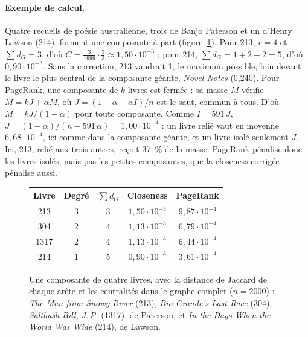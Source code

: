 \paragraph{Exemple de calcul.} Quatre recueils de poésie australienne, trois de
Banjo Paterson et un d'Henry Lawson (214), forment une composante à part
(figure~\ref{fig:exemple}). Pour 213, $r = 4$ et $\sum d_G = 3$, d'où
$C = \frac{3}{1999} \cdot \frac{3}{3} \approx 1{,}50 \cdot 10^{-3}$ ; pour 214,
$\sum d_G = 1 + 2 + 2 = 5$, d'où $0{,}90 \cdot 10^{-3}$. Sans la correction, 213
vaudrait 1, le maximum possible, loin devant le livre le plus central de la
composante géante, \emph{Novel Notes} (0,240). Pour PageRank, une composante de
$k$ livres est fermée : sa masse $M$ vérifie $M = kJ + \alpha M$, où
$J = (1 - \alpha + \alpha I)/n$ est le saut, commun à tous. D'où
$M = kJ/(1 - \alpha)$ pour toute composante. Comme $I = 591\,J$,
$J = (1 - \alpha)/(n - 591\,\alpha) = 1{,}00 \cdot 10^{-4}$ : un livre relié
vaut en moyenne $6{,}68 \cdot 10^{-4}$, ici comme dans la composante géante, et
un livre isolé seulement $J$. Ici, 213, relié aux trois autres, reçoit 37~\% de
la masse. PageRank pénalise donc les livres isolés, mais pas les petites
composantes, que la closeness corrigée pénalise aussi.

\begin{figure}[t]
\centering
\begin{minipage}[c]{0.42\textwidth}
\centering
{}
\end{minipage}\hfill
\begin{minipage}[c]{0.56\textwidth}
\centering
\small
\begin{tabular}{@{}ccccc@{}}
  \toprule
  Livre & Degré & $\sum d_G$ & Closeness & PageRank \\
  \midrule
  213 & 3 & 3 & $1{,}50 \cdot 10^{-3}$ & $9{,}87 \cdot 10^{-4}$ \\
  304 & 2 & 4 & $1{,}13 \cdot 10^{-3}$ & $6{,}79 \cdot 10^{-4}$ \\
  1317 & 2 & 4 & $1{,}13 \cdot 10^{-3}$ & $6{,}44 \cdot 10^{-4}$ \\
  214 & 1 & 5 & $0{,}90 \cdot 10^{-3}$ & $3{,}61 \cdot 10^{-4}$ \\
  \bottomrule
\end{tabular}
\end{minipage}
\caption{Une composante de quatre livres, avec la distance de Jaccard de chaque
  arête et les centralités dans le graphe complet ($n = 2000$) : \emph{The Man
  from Snowy River} (213), \emph{Rio Grande's Last Race} (304), \emph{Saltbush
  Bill, J.\,P.} (1317), de Paterson, et \emph{In the Days When the World Was
  Wide} (214), de Lawson.}
\label{fig:exemple}
\end{figure}

